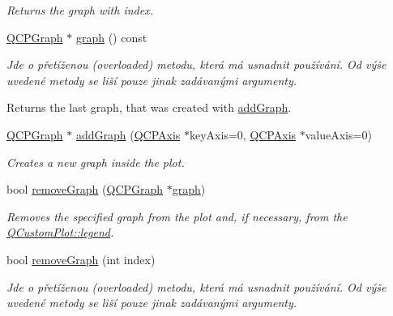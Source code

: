 \begin{DoxyCompactItemize}
\begin{DoxyCompactList}\small\item\em Returns the graph with {\itshape index}. \end{DoxyCompactList}\item 
\hyperlink{classQCPGraph}{Q\+C\+P\+Graph} $\ast$ \hyperlink{classQCustomPlot_a80c40ced2a74eefe9e92de1e82ba2274}{graph} () const 
\begin{DoxyCompactList}\small\item\em Jde o přetíženou (overloaded) metodu, která má usnadnit používání. Od výše uvedené metody se liší pouze jinak zadávanými argumenty.

Returns the last graph, that was created with \hyperlink{classQCustomPlot_a6fb2873d35a8a8089842d81a70a54167}{add\+Graph}. \end{DoxyCompactList}\item 
\hyperlink{classQCPGraph}{Q\+C\+P\+Graph} $\ast$ \hyperlink{classQCustomPlot_a6fb2873d35a8a8089842d81a70a54167}{add\+Graph} (\hyperlink{classQCPAxis}{Q\+C\+P\+Axis} $\ast$key\+Axis=0, \hyperlink{classQCPAxis}{Q\+C\+P\+Axis} $\ast$value\+Axis=0)
\begin{DoxyCompactList}\small\item\em Creates a new graph inside the plot. \end{DoxyCompactList}\item 
bool \hyperlink{classQCustomPlot_a903561be895fb6528a770d66ac5e6713}{remove\+Graph} (\hyperlink{classQCPGraph}{Q\+C\+P\+Graph} $\ast$\hyperlink{classQCustomPlot_a6d3ed93c2bf46ab7fa670d66be4cddaf}{graph})
\begin{DoxyCompactList}\small\item\em Removes the specified {\itshape graph} from the plot and, if necessary, from the \hyperlink{classQCustomPlot_a4eadcd237dc6a09938b68b16877fa6af}{Q\+Custom\+Plot\+::legend}. \end{DoxyCompactList}\item 
\hypertarget{classQCustomPlot_a9554b3d2d5b10c0f884bd4010b6c192c}{}bool \hyperlink{classQCustomPlot_a9554b3d2d5b10c0f884bd4010b6c192c}{remove\+Graph} (int index)\label{classQCustomPlot_a9554b3d2d5b10c0f884bd4010b6c192c}

\begin{DoxyCompactList}\small\item\em Jde o přetíženou (overloaded) metodu, která má usnadnit používání. Od výše uvedené metody se liší pouze jinak zadávanými argumenty.


\end{DoxyCompactList}
\end{DoxyCompactItemize}
